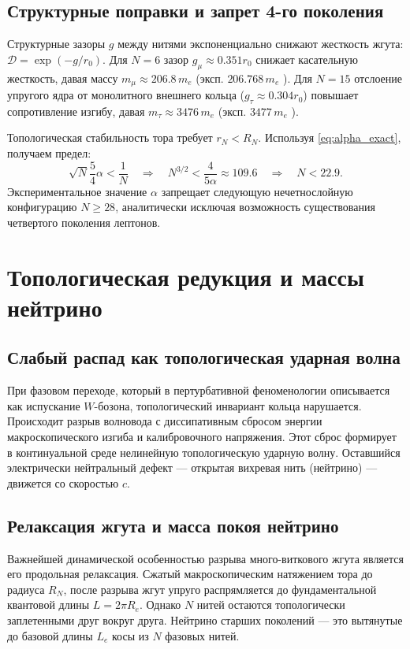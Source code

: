 \documentclass[12pt,a4paper]{article}
\begin{document}
	\subsection{Структурные поправки и запрет 4-го поколения}
	Структурные зазоры $g$ между нитями экспоненциально снижают жесткость жгута: $\mathcal{D} = \exp(-g/r_0)$.
	Для $N=6$ зазор $g_\mu \approx 0.351 r_0$ снижает касательную жесткость, давая массу $m_\mu \approx 206.8 \, m_e$ (эксп. $206.768 \, m_e$ \cite{pdg2024}). Для $N=15$ отслоение упругого ядра от монолитного внешнего кольца ($g_\tau \approx 0.304 r_0$) повышает сопротивление изгибу, давая $m_\tau \approx 3476 \, m_e$ (эксп. $3477 \, m_e$ \cite{pdg2024}).
	
	Топологическая стабильность тора требует $r_N < R_N$. Используя \eqref{eq:alpha_exact}, получаем предел:
	\begin{equation}
		\sqrt{N} \frac{5}{4} \alpha < \frac{1}{N} \quad \Longrightarrow \quad N^{3/2} < \frac{4}{5\alpha} \approx 109.6 \quad \Longrightarrow \quad N < 22.9.
	\end{equation}
	Экспериментальное значение $\alpha$ \cite{codata2018} запрещает следующую нечетнослойную конфигурацию $N \ge 28$, аналитически исключая возможность существования четвертого поколения лептонов.
	
	\section{Топологическая редукция и массы нейтрино}
	
	\subsection{Слабый распад как топологическая ударная волна}
	При фазовом переходе, который в пертурбативной феноменологии описывается как испускание $W$-бозона, топологический инвариант кольца нарушается. Происходит разрыв волновода с диссипативным сбросом энергии макроскопического изгиба и калибровочного напряжения. Этот сброс формирует в континуальной среде нелинейную топологическую ударную волну.
	Оставшийся электрически нейтральный дефект — открытая вихревая нить (нейтрино) — движется со скоростью $c$.
	
	\subsection{Релаксация жгута и масса покоя нейтрино}
	Важнейшей динамической особенностью разрыва много-виткового жгута является его продольная релаксация. Сжатый макроскопическим натяжением тора до радиуса $R_N$, после разрыва жгут упруго распрямляется до фундаментальной квантовой длины $L = 2\pi R_e$. Однако $N$ нитей остаются топологически заплетенными друг вокруг друга. Нейтрино старших поколений — это вытянутые до базовой длины $L_e$ косы из $N$ фазовых нитей.
	
\end{document}
